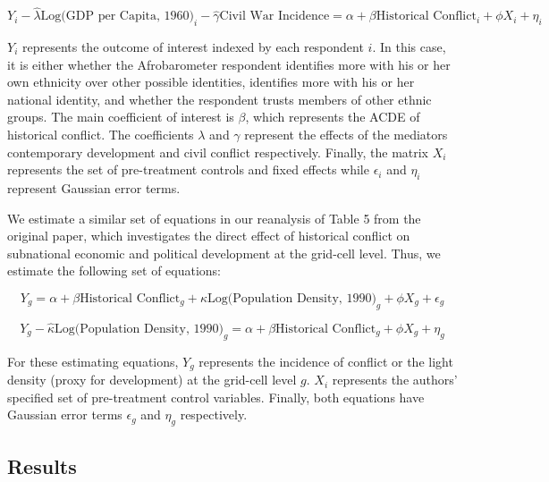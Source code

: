\begin{equation}
Y_i - \widehat{\lambda} \text{Log(GDP per Capita, 1960)}_i - \widehat{\gamma} \text{Civil War Incidence}= \alpha + \beta \text{Historical Conflict}_i + \phi X_i + \eta_i
\end{equation}

$Y_i$ represents the outcome of interest indexed by each respondent $i$. In this case, it is either whether the Afrobarometer respondent identifies more with his or her own ethnicity over other possible identities, identifies more with his or her national identity, and whether the respondent trusts members of other ethnic groups. The main coefficient of interest is $\beta$, which represents the ACDE of historical conflict. The coefficients $\lambda$ and $\gamma$ represent the effects of the mediators contemporary development and civil conflict respectively. Finally, the matrix $X_i$ represents the set of pre-treatment controls and fixed effects while $\epsilon_i$ and $\eta_i$ represent Gaussian error terms. 

We estimate a similar set of equations in our reanalysis of Table 5 from the original paper, which investigates the direct effect of historical conflict on subnational economic and political development at the grid-cell level. Thus, we estimate the following set of equations:

\begin{equation}
Y_g = \alpha + \beta \text{Historical Conflict}_g + \kappa \text{Log(Population Density, 1990)}_g + \phi X_g + \epsilon_g
\end{equation}

\begin{equation}
Y_g - \widehat{\kappa} \text{Log(Population Density, 1990)}_g = \alpha + \beta \text{Historical Conflict}_g + \phi X_g + \eta_g
\end{equation}

For these estimating equations, $Y_g$ represents the incidence of conflict or the light density (proxy for development) at the grid-cell level $g$. $X_i$ represents the authors' specified set of pre-treatment control variables. Finally, both equations have Gaussian error terms $\epsilon_g$ and $\eta_g$ respectively. 

\subsection{Results} \label{acderesults}

